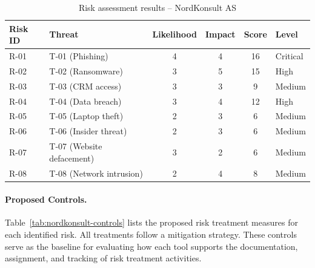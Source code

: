 \begin{table}[ht]
\centering
\caption{Risk assessment results -- NordKonsult AS}
\label{tab:nordkonsult-risks}
\begin{tabular}{llcccl}
\hline
\textbf{Risk ID} & \textbf{Threat} & \textbf{Likelihood} & \textbf{Impact} & \textbf{Score} & \textbf{Level} \\
\hline
R-01 & T-01 (Phishing)             & 4 & 4 & 16 & Critical \\
R-02 & T-02 (Ransomware)           & 3 & 5 & 15 & High \\
R-03 & T-03 (CRM access)           & 3 & 3 &  9 & Medium \\
R-04 & T-04 (Data breach)          & 3 & 4 & 12 & High \\
R-05 & T-05 (Laptop theft)         & 2 & 3 &  6 & Medium \\
R-06 & T-06 (Insider threat)       & 2 & 3 &  6 & Medium \\
R-07 & T-07 (Website defacement)   & 3 & 2 &  6 & Medium \\
R-08 & T-08 (Network intrusion)    & 2 & 4 &  8 & Medium \\
\hline
\end{tabular}
\end{table}
 
\paragraph{Proposed Controls.}
Table~\ref{tab:nordkonsult-controls} lists the proposed risk treatment measures for each identified risk. All treatments follow a mitigation strategy. These controls serve as the baseline for evaluating how each tool supports the documentation, assignment, and tracking of risk treatment activities.
 
